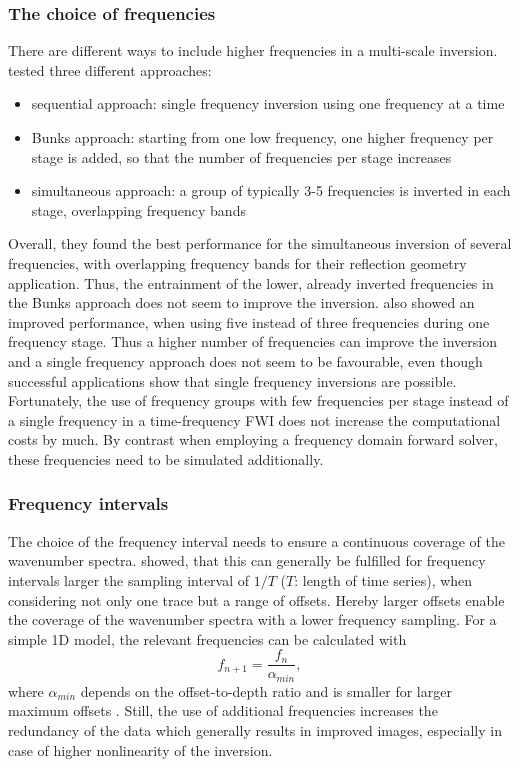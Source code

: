 \subsubsection*{The choice of frequencies}
There are different ways to include higher frequencies in a multi-scale inversion. \cite{Bro09} tested three different approaches:
\begin{itemize}
\item sequential approach: single frequency inversion using one frequency at a time
 \item Bunks approach: starting from one low frequency, one higher frequency per stage is added, so that the number of frequencies per stage increases
\item simultaneous approach: a group of typically 3-5 frequencies is inverted in each stage, overlapping frequency bands
\end{itemize}
Overall, they found the best performance for the simultaneous inversion of several frequencies, with overlapping frequency bands for their reflection geometry application. Thus, the entrainment of the lower, already inverted frequencies in the Bunks approach does not seem to improve the inversion. \cite{Pra99} also showed an improved performance, when using five instead of three frequencies during one frequency stage. Thus a higher number of frequencies can improve the inversion and a single frequency approach does not seem to be favourable, even though successful applications show that single frequency inversions are possible.\\
Fortunately, the use of frequency groups with few frequencies per stage instead of a single frequency in a time-frequency FWI does not increase the computational costs by much. By contrast when employing a frequency domain forward solver, these frequencies need to be simulated additionally.
\subsubsection*{Frequency intervals}
The choice of the frequency interval needs to ensure a continuous coverage of the wavenumber spectra. \cite{Sir04} showed, that this can generally be fulfilled for frequency intervals larger the sampling interval of $1/T$ ($T$: length of time series), when considering not only one trace but a range of offsets.  Hereby larger offsets enable the coverage of the wavenumber spectra with a lower frequency sampling. For a simple 1D model, the relevant frequencies can be calculated with 
\begin{equation} f_{n+1}=\frac{f_n}{\alpha_{min}},\end{equation}
where $\alpha_{min}$ depends on the offset-to-depth ratio and is smaller for larger maximum offsets \citep{Sir04}.  Still, the use of additional  frequencies increases the redundancy of the data which generally results in improved images, especially in case of higher nonlinearity of the inversion.
